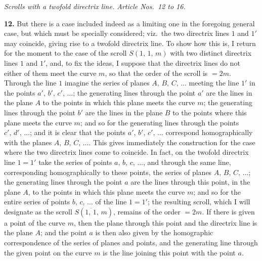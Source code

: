 \documentclass[11pt,a4paper]{article}
\begin{document}
\bigskip

\begin{center}
\textit{Scrolls with a twofold directrix line. Article Nos.\ 12 to 16.}
\end{center}

\textbf{12.} But there is a case included indeed as a limiting one in the foregoing general case, but which must be specially considered; viz.\ the two directrix lines $1$ and $1'$ may coincide, giving rise to a twofold directrix line. To show how this is, I return for the moment to the case of the scroll $S(1,\,1,\,m)$ with two distinct directrix lines $1$ and $1'$, and, to fix the ideas, I suppose that the directrix lines do not either of them meet the curve $m$, so that the order of the scroll is $= 2m$. Through the line $1$ imagine the series of planes $A,\,B,\,C,\,\ldots$ meeting the line $1'$ in the points $a',\,b',\,c',\,\ldots$; the generating lines through the point $a'$ are the lines in the plane $A$ to the points in which this plane meets the curve $m$; the generating lines through the point $b'$ are the lines in the plane $B$ to the points where this plane meets the curve $m$; and so for the generating lines through the points $c',\,d',\,\ldots$; and it is clear that the points $a',\,b',\,c',\,\ldots$ correspond homographically with the planes $A,\,B,\,C,\,\ldots$. This gives immediately the construction for the case where the two directrix lines come to coincide. In fact, on the twofold directrix line $1 = 1'$ take the series of points $a,\,b,\,c,\,\ldots$, and through the same line, corresponding homographically to these points, the series of planes $A,\,B,\,C,\,\ldots$; the generating lines through the point $a$ are the lines through this point, in the plane $A$, to the points in which this plane meets the curve $m$; and so for the entire series of points $b,\,c,\,\ldots$ of the line $1 = 1'$; the resulting scroll, which I will designate as the scroll $S(\overline{1,\,1},\,m)$, remains of the order $= 2m$. If there is given a point of the curve $m$, then the plane through this point and the directrix line is the plane $A$; and the point $a$ is then also given by the homographic correspondence of the series of planes and points, and the generating line through the given point on the curve $m$ is the line joining this point with the point $a$.

\medskip
\end{document}
